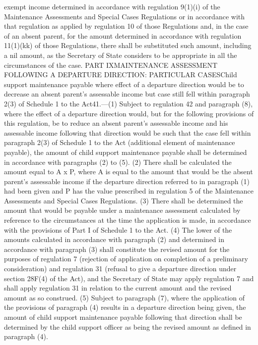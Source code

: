 \documentclass[a4paper]{article}
\begin{document}
exempt income determined in accordance with regulation 9(1)(i) of the
Maintenance Assessments and Special Cases Regulations or in accordance with that
regulation as applied by regulation 10 of those Regulations and, in the case of
an absent parent, for the amount determined in accordance with regulation
11(1)(kk) of those Regulations, there shall be substituted such amount,
including a nil amount, as the Secretary of State considers to be appropriate in
all the circumstances of the case.
PART IXMAINTENANCE ASSESSMENT FOLLOWING A DEPARTURE DIRECTION: PARTICULAR
CASESChild support maintenance payable where effect of a departure direction
would be to decrease an absent parent’s assessable income but case still fell
within paragraph 2(3) of Schedule 1 to the Act41.—(1) Subject to regulation 42
and paragraph (8), where the effect of a departure direction would, but for the
following provisions of this regulation, be to reduce an absent parent’s
assessable income and his assessable income following that direction would be
such that the case fell within paragraph 2(3) of Schedule 1 to the Act
(additional element of maintenance payable), the amount of child support
maintenance payable shall be determined in accordance with paragraphs (2) to
(5).
(2) There shall be calculated the amount equal to A x P, where A is equal to the
amount that would be the absent parent’s assessable income if the departure
direction referred to in paragraph (1) had been given and P has the value
prescribed in regulation 5 of the Maintenance Assessments and Special Cases
Regulations.
(3) There shall be determined the amount that would be payable under a
maintenance assessment calculated by reference to the circumstances at the time
the application is made, in accordance with the provisions of Part I of Schedule
1 to the Act.
(4) The lower of the amounts calculated in accordance with paragraph (2) and
determined in accordance with paragraph (3) shall constitute the revised amount
for the purposes of regulation 7 (rejection of application on completion of a
preliminary consideration) and regulation 31 (refusal to give a departure
direction under section 28F(4) of the Act), and the Secretary of State may apply
regulation 7 and shall apply regulation 31 in relation to the current amount and
the revised amount as so construed.
(5) Subject to paragraph (7), where the application of the provisions of
paragraph (4) results in a departure direction being given, the amount of child
support maintenance payable following that direction shall be determined by the
child support officer as being the revised amount as defined in paragraph (4).
\end{document}
